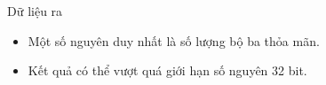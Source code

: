 Dữ liệu ra
\begin{itemize}
	\item Một số nguyên duy nhất là số lượng bộ ba thỏa mãn.
	\item Kết quả có thể vượt quá giới hạn số nguyên 32 bit.
\end{itemize}
